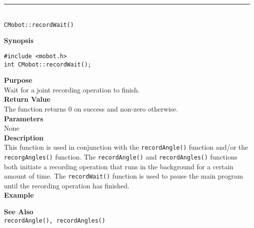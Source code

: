 \noindent
\vspace{5pt}
\rule{4.5in}{0.015in}\\
\noindent
{\LARGE \texttt{CMobot::recordWait()}}\\
{}

\noindent
{\bf Synopsis}
\vspace{-8pt}
\begin{verbatim}
#include <mobot.h>
int CMobot::recordWait();
\end{verbatim}

\noindent
{\bf Purpose}\\
Wait for a joint recording operation to finish.\\

\noindent
{\bf Return Value}\\
The function returns 0 on success and non-zero otherwise.\\

\noindent
{\bf Parameters}\\
None\\

\noindent
{\bf Description}\\
This function is used in conjunction with the \texttt{recordAngle()} function and/or
the \texttt{recorgAngles()} function. The \texttt{recordAngle()} and \texttt{recordAngles()} 
functions both initiate a recording operation that runs in the background for a certain 
amount of time. The \texttt{recordWait()} function is used to pause the main program
until the recording operation has finished. \\

\noindent
{\bf Example}\\
\noindent

\noindent
{\bf See Also}\\
\texttt{recordAngle(), recordAngles()} \\
